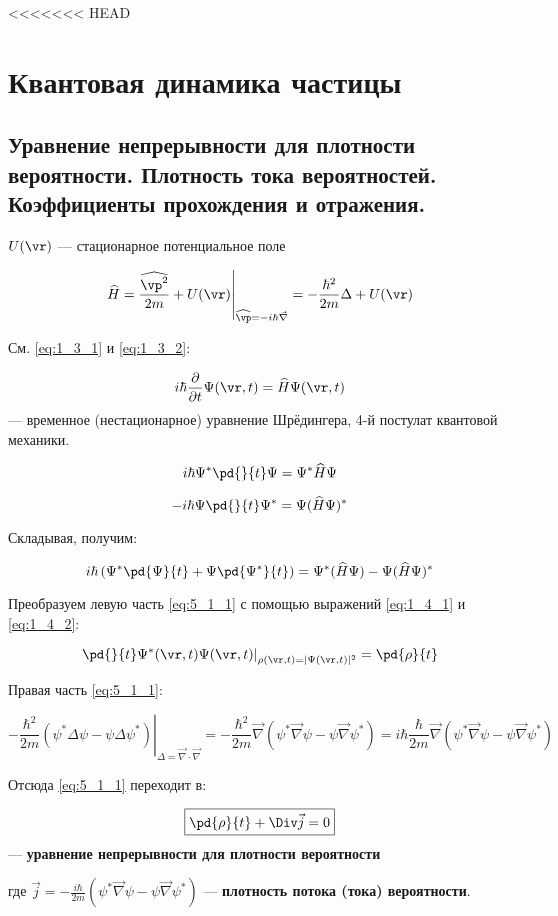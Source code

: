 <<<<<<< HEAD
\chapter{Квантовая динамика частицы}

\section{Уравнение непрерывности для плотности вероятности. Плотность тока вероятностей. Коэффициенты прохождения и отражения.}

$U(\vr)$ --- стационарное потенциальное поле

$$\left. \widehat{H}=\frac{\widehat{\vp^2}}{2m}+U(\vr) \right|_{\widehat{\vp}=-i\hbar\vec{\nabla}} =-\frac{\hbar^2}{2m}\Delta+U(\vr)$$

См. \eqref{eq:1_3_1} и \eqref{eq:1_3_2}:

$$i\hbar\frac{\partial}{\partial{t}}\Psi(\vr,t)=\widehat{H}\Psi(\vr,t)$$
--- временное (нестационарное) уравнение Шрёдингера, 4-й постулат квантовой механики.

$$i\hbar\Psi^*\pd{}{t}\Psi=\Psi^*\widehat{H}\Psi$$

$$-i\hbar\Psi\pd{}{t}\Psi^*=\Psi(\widehat{H}\Psi)^*$$

Складывая, получим:

\begin{equation}
\label{eq:5_1_1}
i\hbar\left(\Psi^*\pd{\Psi}{t}+\Psi\pd{\Psi^*}{t}\right)=\Psi^*(\widehat{H}\Psi)-\Psi(\widehat{H}\Psi)^*
\end{equation}

Преобразуем левую часть \eqref{eq:5_1_1} с помощью выражений \eqref{eq:1_4_1} и \eqref{eq:1_4_2}:

$$\left.\pd{}{t}\Psi^*(\vr,t)\Psi(\vr,t)\right|_{\rho(\vr,t)=|\Psi(\vr,t)|^2} =\pd{\rho}{t}$$


Правая часть \eqref{eq:5_1_1}: 

$$\left. -\frac{\hbar^2}{2m}(\psi^*\Delta\psi-\psi\Delta\psi^*)\right|_{\Delta=\vec{\nabla}\cdot\vec{\nabla}} =-\frac{\hbar^2}{2m}\vec{\nabla}(\psi^*\vec{\nabla}\psi-\psi\vec{\nabla}\psi^*) = i\hbar\frac{\hbar}{2m}\vec{\nabla}(\psi^*\vec{\nabla}\psi-\psi\vec{\nabla}\psi^*)$$

Отсюда \eqref{eq:5_1_1} переходит в:

$$\boxed{\pd{\rho}{t}+\Div\vec{j}=0}$$ --- \textbf{уравнение непрерывности для плотности вероятности}

где $\boxed{\vec{j}=-\frac{i\hbar}{2m}(\psi^*\vec{\nabla}\psi-\psi\vec{\nabla}\psi^*)}$ --- \textbf{плотность потока (тока) вероятности}.

